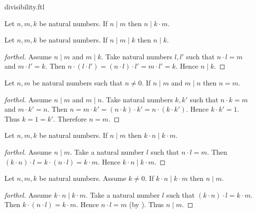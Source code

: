\documentclass{naproche-library}
\begin{document}
\begin{smodule}{divisibility.ftl}
  \begin{corollary}[forthel,id=ARITHMETIC_07_1588185794609152]
    Let $n, m, k$ be natural numbers.
    If $n \mid m$ then $n \mid k \cdot m$.
  \end{corollary}

  \begin{proposition}[forthel,id=ARITHMETIC_07_7863858316181504]
    Let $n, m, k$ be natural numbers.
    If $n \mid m \mid k$ then $n \mid k$.
  \end{proposition}
  \begin{proof}[forthel]
    Assume $n \mid m$ and $m \mid k$.
    Take natural numbers $l,l'$ such that $n \cdot l = m$ and $m \cdot l' = k$.
    Then $n \cdot (l \cdot l')
      = (n \cdot l) \cdot l'
      = m \cdot l'
      = k$.
    Hence $n \mid k$.
  \end{proof}

  \begin{proposition}[forthel,id=ARITHMETIC_07_4933275640397824]
    Let $n, m$ be natural numbers such that $n \neq 0$.
    If $n \mid m$ and $m \mid n$ then $n = m$.
  \end{proposition}
  \begin{proof}[forthel]
    Assume $n \mid m$ and $m \mid n$.
    Take natural numbers $k,k'$ such that $n \cdot k = m$ and $m \cdot k' = n$.
    Then $n
      = m \cdot k'
      = (n \cdot k) \cdot k'
      = n \cdot (k \cdot k')$.
    Hence $k \cdot k' = 1$.
    Thus $k = 1 = k'$.
    Therefore $n = m$.
  \end{proof}

  \begin{proposition}[forthel,id=ARITHMETIC_07_1283495225720832]
    Let $n, m, k$ be natural numbers.
    If $n \mid m$ then $k \cdot n \mid k \cdot m$.
  \end{proposition}
  \begin{proof}[forthel]
    Assume $n \mid m$.
    Take a natural number $l$ such that $n \cdot l = m$.
    Then $(k \cdot n) \cdot l
      = k \cdot (n \cdot l)
      = k \cdot m$.
    Hence $k \cdot n \mid k \cdot m$.
  \end{proof}

  \begin{proposition}[forthel,id=ARITHMETIC_07_6469492028735488]
    Let $n, m, k$ be natural numbers.
    Assume $k \neq 0$.
    If $k \cdot n \mid k \cdot m$ then $n \mid m$.
  \end{proposition}
  \begin{proof}[forthel]
    Assume $k \cdot n \mid k \cdot m$.
    Take a natural number $l$ such that $(k \cdot n) \cdot l = k \cdot m$.
    Then $k \cdot (n \cdot l) = k \cdot m$.
    Hence $n \cdot l = m$ (by ).
    Thus $n \mid m$.
  \end{proof}


\end{smodule}
\end{document}

